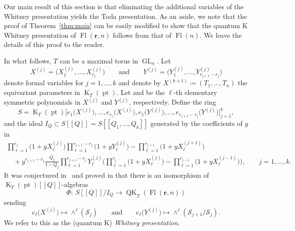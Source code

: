 \documentclass[pdftex]{sigma}
\numberwithin{equation}{section}
\theoremstyle{definition}
\newcommand{\br}[1]{\left(#1\right)}
\DeclareMathOperator{\GL}{GL}
\DeclareMathOperator{\Fl}{Fl}
\DeclareMathOperator{\QK}{QK}
\DeclareMathOperator{\K}{K}
\DeclareMathOperator{\pt}{pt}
\newcommand{\bfr}{{\mathbf r}}
\newcommand{\cS}{{\mathcal S}}
\begin{document}
Our main result of this section is that eliminating the additional variables of the Whitney presentation yields the Toda presentation. As an aside, we note that the proof of Theorem~\ref{thm:main} can be easily modified to show that the quantum K Whitney presentation of $\Fl(\bfr,n)$ follows from that of $\Fl(n)$.
We leave the details of this proof to the reader.

In what follows, $T$ can be a maximal torus in $\GL_n$.
Let
\[
 {X}^{(j)}=\bigl(X^{(j)}_1,\dots,X^{(j)}_{r_j}\bigr) \qquad\text{and}\qquad {Y}^{(j)}=\bigl(Y^{(j)}_1,\dots,
Y^{(j)}_{r_{j+1}-r_j}\bigr)
\]
denote formal variables for $j=1,\dots,k$ and denote by $X^{(k+1)}\coloneqq (T_1,\dots,T_n)$ the equivariant parameters in $\K_T(\pt)$. Let  and  be the $\ell$-th elementary symmetric polynomials in ${X}^{(j)}$ and ${Y}^{(j)}$, respectively. Define the ring
 \[
 S=\K_T(\pt)\bigl[e_1\bigl(X^{(j)}\bigr),\dots, e_{r_j}\bigl(X^{(j)}\bigr),e_1\bigl(Y^{(j)}\bigr),\dots,e_{r_{j+1}-r_j}\bigl(Y^{(j)}\bigr)\bigr]_{j=1}^k ,
 \]
 and the ideal $I_Q\subset S[\![Q]\!]=S[\![Q_1,\dots,Q_k]\!]$
generated by the coefficients of $y$ in
\begin{gather}\label{eqn:qkrel}
 \prod_{\ell=1}^{r_j}\bigl(1+y X^{(j)}_\ell\bigr)\prod_{\ell=1}^{r_{j+1}-r_j}\bigl(1+y Y^{(j)}_\ell\bigr)-\prod_{\ell=1}^{r_{j+1}}\bigl(1+y X^{(j+1)}_\ell\bigr)\\
 \quad{}+y^{{r_{j+1}-r_j}}\frac{Q_j}{1-Q_j}\prod_{\ell=1}^{r_{j+1}-r_j}Y^{(j)}_\ell\Biggl(\prod_{\ell=1}^{r_j}\bigl(1+yX^{(j)}_\ell\bigr) -\prod_{\ell=1}^{r_{j-1}}\bigl(1+yX^{(j-1)}_\ell\bigr)\Biggr), \qquad j=1,\dots, k. \nonumber
\end{gather}
It was conjectured in~\cite{gu2023quantum,GMSXZZ:QKW} and proved in
\cite{huq2024quantum} that
there is an isomorphism of $\K_T(\pt)[\![Q]\!]$-algebras
 \begin{equation}\label{E:QKWhitney}
 \Phi\colon\ {S[\![Q]\!]}/I_Q\to \QK_T\br{\Fl(\bfr,n)}
 \end{equation}
 sending
 \[ e_\ell\bigl(X^{(j)}\bigr) \mapsto \wedge^\ell(\cS_{j}) \qquad \textrm{and} \qquad e_\ell\bigl(Y^{(j)}\bigr) \mapsto \wedge^\ell(\cS_{{j+1}}/\cS_{j}) . \]
 We refer to this as the (quantum K) {\em Whitney presentation}.
\end{document}
